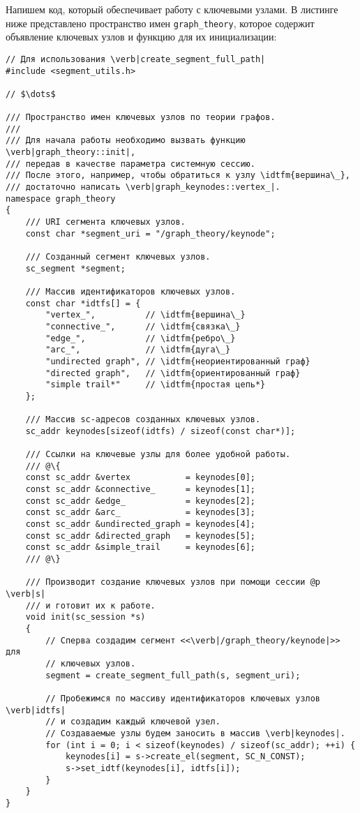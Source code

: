 Напишем код, который обеспечивает работу с ключевыми
узлами. В листинге ниже представлено пространство имен
\lstinline|graph_theory|, которое содержит объявление ключевых узлов и
функцию для их инициализации:
\begin{lstlisting}[texcl]
// Для использования \verb|create_segment_full_path|
#include <segment_utils.h>

// $\dots$

/// Пространство имен ключевых узлов по теории графов.
///
/// Для начала работы необходимо вызвать функцию \verb|graph_theory::init|,
/// передав в качестве параметра системную сессию.
/// После этого, например, чтобы обратиться к узлу \idtfm{вершина\_},
/// достаточно написать \verb|graph_keynodes::vertex_|.
namespace graph_theory
{
    /// URI сегмента ключевых узлов.
    const char *segment_uri = "/graph_theory/keynode";

    /// Созданный сегмент ключевых узлов.
    sc_segment *segment;

    /// Массив идентификаторов ключевых узлов.
    const char *idtfs[] = {
        "vertex_",          // \idtfm{вершина\_}
        "connective_",      // \idtfm{связка\_}
        "edge_",            // \idtfm{ребро\_}
        "arc_",             // \idtfm{дуга\_}
        "undirected graph", // \idtfm{неориентированный граф}
        "directed graph",   // \idtfm{ориентированный граф}
        "simple trail*"     // \idtfm{простая цепь*}
    };

    /// Массив sc-адресов созданных ключевых узлов.
    sc_addr keynodes[sizeof(idtfs) / sizeof(const char*)];

    /// Ссылки на ключевые узлы для более удобной работы.
    /// @\{
    const sc_addr &vertex           = keynodes[0];
    const sc_addr &connective_      = keynodes[1];
    const sc_addr &edge_            = keynodes[2];
    const sc_addr &arc_             = keynodes[3];
    const sc_addr &undirected_graph = keynodes[4];
    const sc_addr &directed_graph   = keynodes[5];
    const sc_addr &simple_trail     = keynodes[6];
    /// @\}

    /// Производит создание ключевых узлов при помощи сессии @p \verb|s|
    /// и готовит их к работе.
    void init(sc_session *s)
    {
        // Сперва создадим сегмент <<\verb|/graph_theory/keynode|>> для
        // ключевых узлов.
        segment = create_segment_full_path(s, segment_uri);

        // Пробежимся по массиву идентификаторов ключевых узлов \verb|idtfs|
        // и создадим каждый ключевой узел.
        // Создаваемые узлы будем заносить в массив \verb|keynodes|.
        for (int i = 0; i < sizeof(keynodes) / sizeof(sc_addr); ++i) {
            keynodes[i] = s->create_el(segment, SC_N_CONST);
            s->set_idtf(keynodes[i], idtfs[i]);
        }
    }
}
\end{lstlisting}

